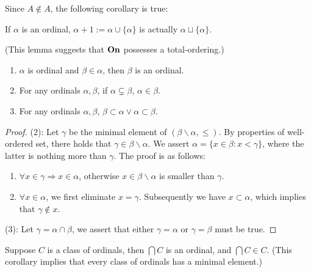 Since $A \notin A$, the following corollary is true:

\begin{corollary}
  If $\alpha$ is an ordinal, $\alpha + 1 := \alpha \cup \{ \alpha \}$ is actually $\alpha \sqcup \{ \alpha \}$.
\end{corollary}







\begin{lemma}

  \label{Ordinal_Tot_ordering}
  (This lemma suggests that $\boldsymbol{\mathrm{On}}$ possesses a total-ordering.)
  \begin{enumerate}
    \item $\alpha$ is ordinal and $\beta \in \alpha$, then $\beta$ is an ordinal.
    \item For any ordinals $\alpha, \beta$, if $\alpha \subsetneq \beta$, $\alpha \in \beta$.
    \item For any ordinals $\alpha, \beta$, $\beta \subset \alpha \vee \alpha \subset \beta$.
  \end{enumerate}
\end{lemma}
\begin{proof}
  (2): Let $\gamma$ be the minimal element of $(\beta \smallsetminus \alpha, \leq)$. By properties of well-ordered set, there holds that $\gamma \in \beta \smallsetminus \alpha$. We assert $\alpha = \{ x \in \beta : x < \gamma \}$, where the latter is nothing more than $\gamma$. The proof is as follows:
  \begin{enumerate}
    \item $\forall x \in \gamma \Rightarrow x \in \alpha$, otherwise $x \in \beta \smallsetminus \alpha$ is smaller than $\gamma$.
    \item $\forall x \in \alpha$, we first eliminate $x = \gamma$. Subsequently we have $x \subset \alpha$, which implies that $\gamma \notin x$.
  \end{enumerate}

  (3): Let $\gamma = \alpha \cap \beta$, 
  we assert that either $\gamma = \alpha$ or $\gamma = \beta$ must be true.
\end{proof}








\begin{corollary}
    \label{Ordinal_Minimal_Element}
    Suppose $C$ is a class of ordinals, then $\bigcap C$ is an ordinal, and $\bigcap C \in C$. %
    (This corollary implies that every class of ordinals has a minimal element.)
\end{corollary}

